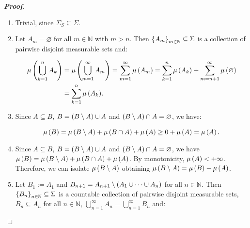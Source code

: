 \begin{proposition}
\begin{proof}[\rm\textbf{Proof}]
\begin{enumerate}
      \begin{equation}
        \begin{split}
          \alpha\cdot\mu\pr{\bigcup_{n=1}^{\infty}{A_n}}+\beta\cdot\nu\pr{\bigcup_{n=1}^{\infty}{A_n}} & =\alpha\cdot\sum_{n=1}^{\infty}{\mu\pr{A_n}}+\beta\cdot\sum_{n=1}^{\infty}{\nu\pr{A_n}}\\
          & =\sum_{n=1}^{\infty}{\pr{\alpha\cdot\mu\pr{A_n}+\beta\cdot\nu\pr{A_n}}}.
        \end{split}
      \end{equation}

      Therefore, $\alpha\cdot\mu+\beta\cdot\nu$ is a measure on $\pr{X,\Sigma}$.
      \item Trivial, since $\Sigma_S\subseteq\Sigma$.
      \item Let $A_m=\varnothing$ for all $m\in\mathbb{N}$ with $m>n$. Then $\left\{A_m\right\}_{m\in\mathbb{N}}\subseteq\Sigma$ is a collection of pairwise disjoint measurable sets and:
      
      \begin{equation}
        \begin{split}
          \mu\left(\bigcup_{k=1}^{n}{A_k}\right) & =\mu\left(\bigcup_{m=1}^{\infty}{A_m}\right)=\sum_{m=1}^{\infty}{\mu\left(A_m\right)}=\sum_{k=1}^{n}{\mu\left(A_k\right)}+\sum_{m=n+1}^{\infty}{\mu\left(\varnothing\right)}\\
          & =\sum_{k=1}^{n}{\mu\left(A_k\right)}.
        \end{split}
      \end{equation}

      \item Since $A\subseteq B$, $B=\left(B\setminus A\right)\cup A$ and $\left(B\setminus A\right)\cap A=\varnothing$, we have:
      
      \begin{equation}
        \mu\left(B\right)=\mu\left(B\setminus A\right)+\mu\left(B\cap A\right)+\mu\left(A\right)\geq 0 + \mu\left(A\right)=\mu\left(A\right).
      \end{equation}

      \item Since $A\subseteq B$, $B=\left(B\setminus A\right)\cup A$ and $\left(B\setminus A\right)\cap A=\varnothing$, we have $\mu\left(B\right)=\mu\left(B\setminus A\right)+\mu\left(B\cap A\right)+\mu\left(A\right)$. By monotonicity, $\mu\left(A\right)<+\infty$. Therefore, we can isolate $\mu\left(B\setminus A\right)$ obtaining $\mu\left(B\setminus A\right)=\mu\left(B\right)-\mu\left(A\right)$.
      \item Let $B_1:=A_1$ and $B_{n+1}=A_{n+1}\setminus\left(A_1\cup\dots\cup A_n\right)$ for all $n\in\mathbb{N}$. Then $\left\{B_n\right\}_{n\in\mathbb{N}}\subseteq\Sigma$ is a countable collection of pairwise disjoint measurable sets, $B_n\subseteq A_n$ for all $n\in\mathbb{N}$, $\bigcup_{n=1}^{\infty}{A_n}=\bigcup_{n=1}^{\infty}{B_n}$ and:
      

\end{enumerate}
\end{proof}
\end{proposition}
